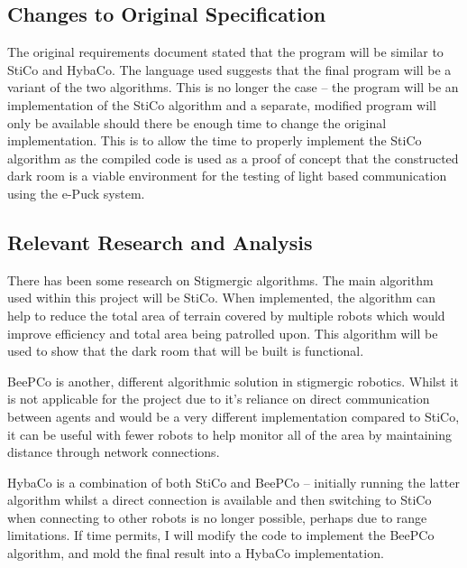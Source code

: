 \subsection{Changes to Original Specification} \label{desReqChanges}
The original requirements document stated that the program will be similar to 
StiCo and HybaCo\cite{myReq}.  The language used suggests that the final
program will be a variant of the two algorithms.  This is no longer the case
-- the program will be an implementation of the StiCo algorithm and a separate,
modified program will only be available should there be enough time to
change the original implementation.  This is to allow the time to properly
implement the StiCo algorithm as the compiled code is used as a proof of
concept that the constructed dark room is a viable environment for the testing
of light based communication using the e-Puck system.

\subsection{Relevant Research and Analysis} \label{desResAnal}
There has been some research on Stigmergic algorithms.  The main algorithm used
within this project will be 
StiCo\cite{Ranjbar-Sahraei2012,Ranjbar-Sahraei2012Demo,Ranjbar-Sahraei2013}.
When implemented, the algorithm can help to reduce the total area of terrain
covered by multiple robots which would improve efficiency and total area 
being patrolled upon.  This algorithm will be used to show that the dark room
that will be built is functional.

BeePCo is another, different algorithmic solution in stigmergic robotics.  
Whilst it is not applicable for the project due to it's reliance on direct
communication between agents and would be a very different implementation 
compared to StiCo, it can be useful with fewer robots to help monitor all of the
area by maintaining distance through network connections.

HybaCo is a combination of both StiCo and BeePCo -- initially running the latter
algorithm whilst a direct connection is available and then switching to StiCo
when connecting to other robots is no longer possible, perhaps due to range
limitations\cite{Broecker2015}.  If time permits, I will modify the code
to implement the BeePCo algorithm, and mold the final result into a HybaCo
implementation.
